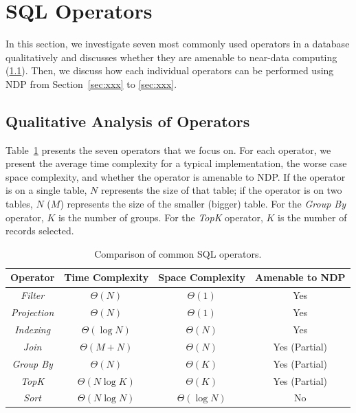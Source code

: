 \documentclass{article}
\newcommand{\filter}{\textit{Filter}\xspace}
\newcommand{\projection}{\textit{Projection}\xspace}
\newcommand{\join}{\textit{Join}\xspace}
\newcommand{\sort}{\textit{Sort}\xspace}
\newcommand{\indexing}{\textit{Indexing}\xspace}
\newcommand{\groupby}{\textit{Group By}\xspace}
\newcommand{\topk}{\textit{TopK}\xspace}
\begin{document}
\section{SQL Operators}

In this section, we investigate seven most commonly used operators in a database qualitatively and discusses whether they are amenable to near-data computing (\cref{sec:analysis}). Then, we discuss how each individual operators can be performed using NDP from Section~\ref{sec:xxx} to \ref{sec:xxx}.

\subsection{Qualitative Analysis of Operators} \label{sec:analysis}

Table~\ref{tab:operators} presents the seven operators that we focus on. For each operator, we present the average time complexity for a typical implementation, the worse case space complexity, and whether the operator is amenable to NDP.
If the operator is on a single table, $N$ represents the size of that table; if the operator is on two tables, $N$ ($M$) represents the size of the smaller (bigger) table. 
For the \textit{Group By} operator, $K$ is the number of groups. For the \textit{TopK} operator, $K$ is the number of records selected. 

\begin{table}
\centering 
\begin{tabular}{ |c|c|c|c| } 
 \hline
 Operator       & Time Complexity & Space Complexity  & Amenable to NDP \\ \hline
 \filter        & $\Theta(N)$     & $\Theta(1)$       & Yes             \\ \hline
 \projection    & $\Theta(N)$     & $\Theta(1)$       & Yes             \\ \hline
 \indexing      & $\Theta(\log{N})$ & $\Theta(N)$     & Yes             \\ \hline
 \join          & $\Theta(M + N)$ & $\Theta(N)$       & Yes (Partial)   \\ \hline
 \groupby       & $\Theta(N)$     & $\Theta(K)$       & Yes (Partial)   \\ \hline
 \topk          & $\Theta(N\log{K})$ & $\Theta(K)$    & Yes (Partial)   \\ \hline
 \sort          & $\Theta(N\log{N})$ & $\Theta(\log{N})$ & No           \\ \hline
\end{tabular}
\caption{Comparison of common SQL operators.}
\label{tab:operators}
\end{table}
\end{document}
